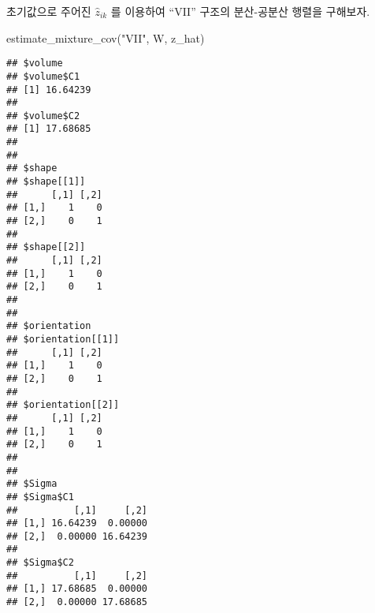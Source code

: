 \documentclass[
]{book}
\newenvironment{Shaded}{\begin{snugshade}}{\end{snugshade}}
\newcommand{\AttributeTok}[1]{\textcolor[rgb]{0.77,0.63,0.00}{#1}}
\newcommand{\ControlFlowTok}[1]{\textcolor[rgb]{0.13,0.29,0.53}{\textbf{#1}}}
\newcommand{\DecValTok}[1]{\textcolor[rgb]{0.00,0.00,0.81}{#1}}
\newcommand{\FunctionTok}[1]{\textcolor[rgb]{0.00,0.00,0.00}{#1}}
\newcommand{\NormalTok}[1]{#1}
\newcommand{\OtherTok}[1]{\textcolor[rgb]{0.56,0.35,0.01}{#1}}
\newcommand{\SpecialCharTok}[1]{\textcolor[rgb]{0.00,0.00,0.00}{#1}}
\newcommand{\StringTok}[1]{\textcolor[rgb]{0.31,0.60,0.02}{#1}}
\begin{document}
\begin{Shaded}
\end{Shaded}

초기값으로 주어진 \(\hat{z}_{ik}\) 를 이용하여 ``VII'' 구조의 분산-공분산 행렬을 구해보자.

\begin{Shaded}
\begin{Highlighting}[]
\FunctionTok{estimate\_mixture\_cov}\NormalTok{(}\StringTok{"VII"}\NormalTok{, W, z\_hat)}
\end{Highlighting}
\end{Shaded}

\begin{verbatim}
## $volume
## $volume$C1
## [1] 16.64239
## 
## $volume$C2
## [1] 17.68685
## 
## 
## $shape
## $shape[[1]]
##      [,1] [,2]
## [1,]    1    0
## [2,]    0    1
## 
## $shape[[2]]
##      [,1] [,2]
## [1,]    1    0
## [2,]    0    1
## 
## 
## $orientation
## $orientation[[1]]
##      [,1] [,2]
## [1,]    1    0
## [2,]    0    1
## 
## $orientation[[2]]
##      [,1] [,2]
## [1,]    1    0
## [2,]    0    1
## 
## 
## $Sigma
## $Sigma$C1
##          [,1]     [,2]
## [1,] 16.64239  0.00000
## [2,]  0.00000 16.64239
## 
## $Sigma$C2
##          [,1]     [,2]
## [1,] 17.68685  0.00000
## [2,]  0.00000 17.68685
\end{verbatim}
\end{document}
